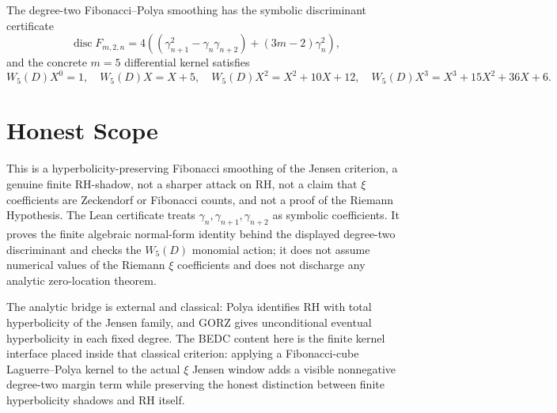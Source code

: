 \begin{theorem}
\label{thm:fibonacci-polya-jensen-kernel-certificate}
The degree-two Fibonacci--Polya smoothing has the symbolic discriminant certificate
$$
\operatorname{disc}F_{m,2,n}
=4\left((\gamma_{n+1}^2-\gamma_n\gamma_{n+2})+(3m-2)\gamma_n^2\right),
$$
and the concrete $m=5$ differential kernel satisfies
$$
W_5(D)X^0=1,\quad
W_5(D)X=X+5,\quad
W_5(D)X^2=X^2+10X+12,\quad
W_5(D)X^3=X^3+15X^2+36X+6.
$$
\end{theorem}

\section{Honest Scope}
\label{sec:fibonacci-polya-jensen-honest-scope}

This is a hyperbolicity-preserving Fibonacci smoothing of the Jensen criterion, a genuine finite RH-shadow, not a sharper attack on RH, not a claim that $\xi$ coefficients are Zeckendorf or Fibonacci counts, and not a proof of the Riemann Hypothesis. The Lean certificate treats $\gamma_n,\gamma_{n+1},\gamma_{n+2}$ as symbolic coefficients. It proves the finite algebraic normal-form identity behind the displayed degree-two discriminant and checks the $W_5(D)$ monomial action; it does not assume numerical values of the Riemann $\xi$ coefficients and does not discharge any analytic zero-location theorem.

The analytic bridge is external and classical: Polya identifies RH with total hyperbolicity of the Jensen family, and GORZ gives unconditional eventual hyperbolicity in each fixed degree. The BEDC content here is the finite kernel interface placed inside that classical criterion: applying a Fibonacci-cube Laguerre--Polya kernel to the actual $\xi$ Jensen window adds a visible nonnegative degree-two margin term while preserving the honest distinction between finite hyperbolicity shadows and RH itself.



